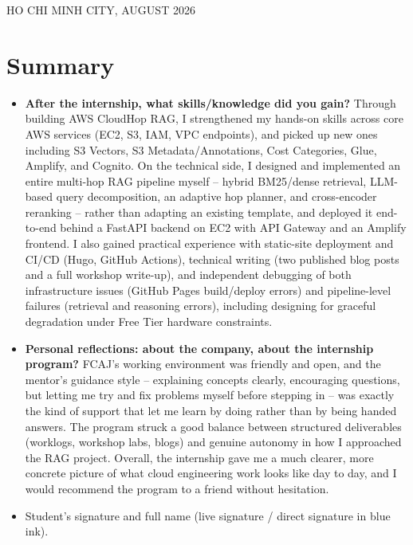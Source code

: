 \documentclass[a4paper]{article}
\begin{document}
\begin{titlepage}
\vspace{0.5cm}
\begin{center}
\large HO CHI MINH CITY, AUGUST 2026
\end{center}
\vfill
\end{titlepage}

\newpage
\tableofcontents
\newpage





\newpage
\section{Summary}
\begin{itemize}
    \item \textbf{After the internship, what skills/knowledge did you gain?} Through building AWS CloudHop RAG, I strengthened my hands-on skills across core AWS services (EC2, S3, IAM, VPC endpoints), and picked up new ones including S3 Vectors, S3 Metadata/Annotations, Cost Categories, Glue, Amplify, and Cognito. On the technical side, I designed and implemented an entire multi-hop RAG pipeline myself -- hybrid BM25/dense retrieval, LLM-based query decomposition, an adaptive hop planner, and cross-encoder reranking -- rather than adapting an existing template, and deployed it end-to-end behind a FastAPI backend on EC2 with API Gateway and an Amplify frontend. I also gained practical experience with static-site deployment and CI/CD (Hugo, GitHub Actions), technical writing (two published blog posts and a full workshop write-up), and independent debugging of both infrastructure issues (GitHub Pages build/deploy errors) and pipeline-level failures (retrieval and reasoning errors), including designing for graceful degradation under Free Tier hardware constraints.
    \item \textbf{Personal reflections: about the company, about the internship program?} FCAJ's working environment was friendly and open, and the mentor's guidance style -- explaining concepts clearly, encouraging questions, but letting me try and fix problems myself before stepping in -- was exactly the kind of support that let me learn by doing rather than by being handed answers. The program struck a good balance between structured deliverables (worklogs, workshop labs, blogs) and genuine autonomy in how I approached the RAG project. Overall, the internship gave me a much clearer, more concrete picture of what cloud engineering work looks like day to day, and I would recommend the program to a friend without hesitation.
    \item Student's signature and full name (live signature / direct signature in blue ink).
\end{itemize}

\end{document}
